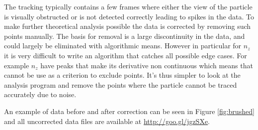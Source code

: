 \label{sec:brushing}
The tracking typically contains a few frames where either the view of the particle is visually obstructed or is not detected correctly 
leading to spikes in the data. To make further theoretical analysis possible the data is corrected by removing such points manually. The basis for removal is a large discontinuity in the data, and could largely be eliminated with algorithmic means. However in particular for $n_z$ it is very difficult to write an algorithm that catches all possible edge cases. For example $n_z$ have peaks that make its derivative non continuous which means that cannot be use as a criterion to exclude points. It's thus simpler to look at the analysis program and remove the points where the particle cannot be traced accurately due to noise. 

An example of data before and after correction can be seen in Figure \ref{fig:brushed} and all uncorrected data files are available at \url{http://goo.gl/jgzSXe}.

